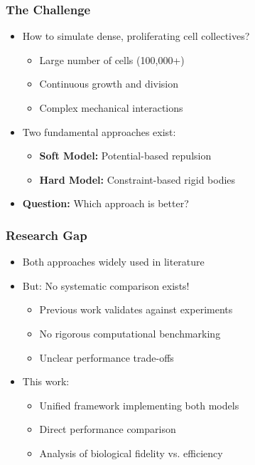 \documentclass[
	10pt,
	t
]{beamer}
\begin{document}
\begin{frame}
    \frametitle{The Challenge}

    \begin{itemize}
        \item How to simulate dense, proliferating cell collectives?
              \begin{itemize}
                  \item Large number of cells (100,000+)
                  \item Continuous growth and division
                  \item Complex mechanical interactions
              \end{itemize}
        \item Two fundamental approaches exist:
              \begin{itemize}
                  \item \textbf{Soft Model:} Potential-based repulsion
                  \item \textbf{Hard Model:} Constraint-based rigid bodies
              \end{itemize}
        \item \textbf{Question:} Which approach is better?
    \end{itemize}

\end{frame}

\begin{frame}
    \frametitle{Research Gap}

    \begin{itemize}
        \item Both approaches widely used in literature
        \item But: No systematic comparison exists!
              \begin{itemize}
                  \item Previous work validates against experiments
                  \item No rigorous computational benchmarking
                  \item Unclear performance trade-offs
              \end{itemize}
        \item This work:
              \begin{itemize}
                  \item Unified framework implementing both models
                  \item Direct performance comparison
                  \item Analysis of biological fidelity vs. efficiency
              \end{itemize}
    \end{itemize}

\end{frame}
\end{document}
